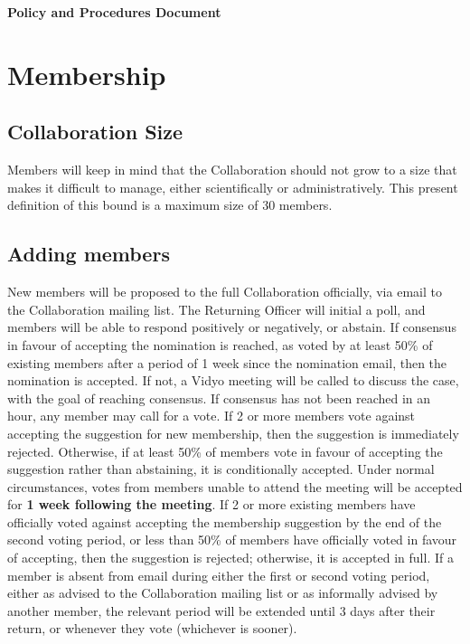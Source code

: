 

\centerline{\textbf{Policy and Procedures Document}}\bigskip 


\section{Membership}

\subsection{Collaboration Size}

Members will keep in mind that the Collaboration should not grow to a size that makes it difficult to manage, either scientifically or administratively.  This present definition of this bound is a maximum size of 30 members.

\subsection{Adding members}

New members will be proposed to the full Collaboration officially, via email to the Collaboration mailing list.  The Returning Officer will initial a poll, and members will be able to respond positively or negatively, or abstain.  If consensus in favour of accepting the nomination is reached, as voted by at least 50\% of existing members after a period of 1 week since the nomination email, then the nomination is accepted.  If not, a Vidyo meeting will be called to discuss the case, with the goal of reaching consensus.  If consensus has not been reached in an hour, any member may call for a vote.  If 2 or more members vote against accepting the suggestion for new membership, then the suggestion is immediately rejected.  Otherwise, if at least 50\% of members vote in favour of accepting the suggestion rather than abstaining, it is conditionally accepted.  Under normal circumstances, votes from members unable to attend the meeting will be accepted for \textbf{1 week following the meeting}.  If 2 or more existing members have officially voted against accepting the membership suggestion by the end of the second voting period, or less than 50\% of members have officially voted in favour of accepting, then the suggestion is rejected; otherwise, it is accepted in full.  If a member is absent from email during either the first or second voting period, either as advised to the Collaboration mailing list or as informally advised by another member, the relevant period will be extended until 3 days after their return, or whenever they vote (whichever is sooner).

